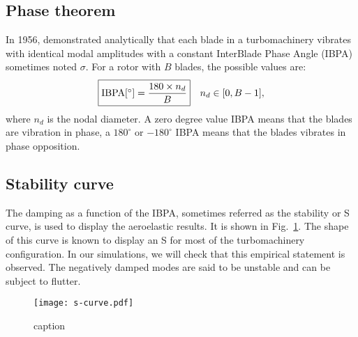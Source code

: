 \subsection{Phase theorem}
\label{sub:lane_theorem}

In 1956, \citet{Lane1956} 
demonstrated analytically that each blade in a turbomachinery vibrates with
identical modal amplitudes with a constant InterBlade
Phase Angle (IBPA) sometimes noted $\sigma$. For a rotor with $B$ blades,
the possible values are:
\begin{equation}
    \fbox{$\textrm{IBPA} [^\circ] = \displaystyle \frac{180 \times n_d}{B}$} \quad n_d \in [0, B-1],
\end{equation}
where $n_d$ is the nodal diameter.
A zero degree value IBPA means that the blades are vibration in phase, a $180^\circ$ or
$-180^\circ$ IBPA means that the blades vibrates in phase opposition.

\subsection{Stability curve}
\label{sub:s_curve}

The damping as a function of the IBPA, sometimes
referred as the stability or S curve, is used to
display the aeroelastic results. It is shown in
Fig.~\ref{fig:s-curve}. The shape of this curve is
known to display an S for most of the
turbomachinery configuration. 
In our simulations, we will check that this empirical
statement is observed.
The negatively damped modes are said to
be unstable and can be subject to flutter.
\begin{figure}[htp]
  \centering
  \texttt{[image: s-curve.pdf]}
  \caption{caption}
  \label{fig:s-curve}
\end{figure}
